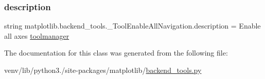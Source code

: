 \subsubsection{\texorpdfstring{description}{description}}
{\footnotesize\ttfamily string matplotlib.\+backend\+\_\+tools.\+\_\+\+Tool\+Enable\+All\+Navigation.\+description = \textquotesingle{}Enable all axes \hyperlink{classmatplotlib_1_1backend__tools_1_1ToolBase_aa7888dab7ba0552f93037f1df4b192f6}{toolmanager}\textquotesingle{}\hspace{0.3cm}{\ttfamily [static]}}



The documentation for this class was generated from the following file\+:\begin{DoxyCompactItemize}
\item 
venv/lib/python3./site-\/packages/matplotlib/\hyperlink{backend__tools_8py}{backend\+\_\+tools.\+py}\end{DoxyCompactItemize}
